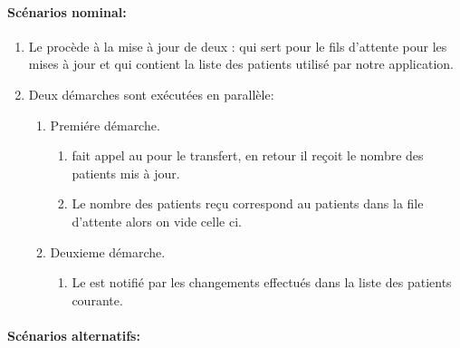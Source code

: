 \paragraph{Scénarios nominal:}

\begin{enumerate}

\item Le  procède à la mise à jour de deux :  qui sert pour le fils d'attente pour les mises à jour et  qui contient la liste des patients utilisé par notre application.

\item Deux démarches sont exécutées en parallèle:\label{enu:par}

\begin{enumerate}[label=\ref{enu:par}.\Alph*]

\item Premiére démarche.\label{enu:par1}

\begin{enumerate}[label=\ref{enu:par1}.\arabic*]

\item {} fait appel au  pour le transfert, en retour il reçoit le nombre des patients mis à jour.

\item Le nombre des patients reçu correspond au patients dans la file d'attente alors on vide celle ci.\label{enu:equalpatients}

\end{enumerate}

\item Deuxieme démarche.\label{enu:par2}

\begin{enumerate}[label=\ref{enu:par2}.\arabic*]

\item Le  est notifié par les changements effectués dans la liste des patients courante.

\end{enumerate}

\end{enumerate}

\end{enumerate}

\paragraph{Scénarios alternatifs:}

